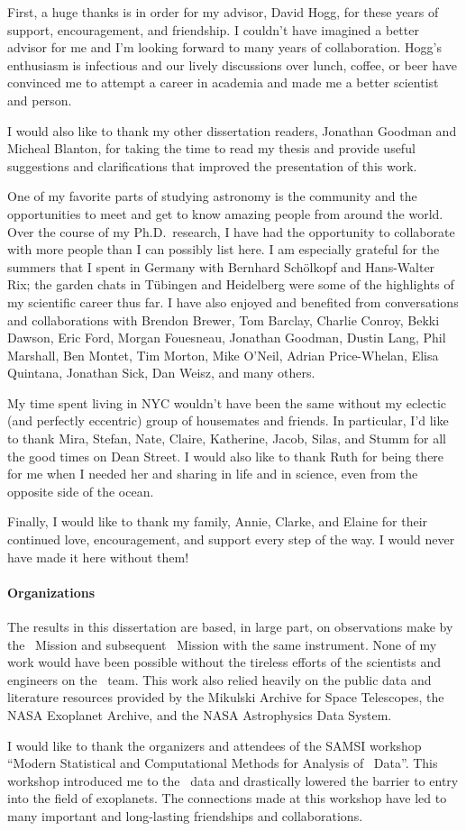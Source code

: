 First, a huge thanks is in order for my advisor, David Hogg, for these years
of support, encouragement, and friendship.
I couldn't have imagined a better advisor for me and I'm looking forward to
many years of collaboration.
Hogg's enthusiasm is infectious and our lively discussions over lunch, coffee,
or beer have convinced me to attempt a career in academia and made me a better
scientist and person.

I would also like to thank my other dissertation readers, Jonathan Goodman and
Micheal Blanton, for taking the time to read my thesis and provide useful
suggestions and clarifications that improved the presentation of this work.

One of my favorite parts of studying astronomy is the community and the
opportunities to meet and get to know amazing people from around the world.
Over the course of my Ph.D.\ research, I have had the opportunity to
collaborate with more people than I can possibly list here.
I am especially grateful for the summers that I spent in Germany with Bernhard
Sch\"olkopf and Hans-Walter Rix; the garden chats in T\"ubingen and Heidelberg
were some of the highlights of my scientific career thus far.
I have also enjoyed and benefited from conversations and collaborations with
Brendon Brewer,
Tom Barclay,
Charlie Conroy,
Bekki Dawson,
Eric Ford,
Morgan Fouesneau,
Jonathan Goodman,
Dustin Lang,
Phil Marshall,
Ben Montet,
Tim Morton,
Mike O'Neil,
Adrian Price-Whelan,
Elisa Quintana,
Jonathan Sick,
Dan Weisz,
and many others.

My time spent living in NYC wouldn't have been the same without my eclectic
(and perfectly eccentric) group of housemates and friends.
In particular, I'd like to thank Mira, Stefan, Nate, Claire, Katherine, Jacob,
Silas, and Stumm for all the good times on Dean Street.
I would also like to thank Ruth for being there for me when I needed her and
sharing in life and in science, even from the opposite side of the ocean.

Finally, I would like to thank my family, Annie, Clarke, and Elaine for their
continued love, encouragement, and support every step of the way.
I would never have made it here without them!

\paragraph{Organizations}
The results in this dissertation are based, in large part, on observations
make by the \kepler\ Mission and subsequent \KT\ Mission with the same
instrument.
None of my work would have been possible without the tireless efforts of the
scientists and engineers on the \kepler\ team.
This work also relied heavily on the public data and literature resources
provided by the Mikulski Archive for Space Telescopes, the NASA Exoplanet
Archive, and the NASA Astrophysics Data System.

I would like to thank the organizers and attendees of the SAMSI workshop
``Modern Statistical and Computational Methods for Analysis of \kepler\
Data''.
This workshop introduced me to the \kepler\ data and drastically lowered the
barrier to entry into the field of exoplanets.
The connections made at this workshop have led to many important and
long-lasting friendships and collaborations.
